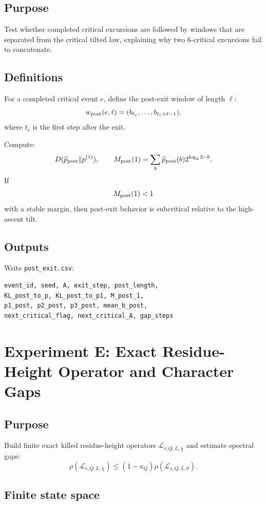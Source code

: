 \documentclass[11pt]{article}
\newcommand{\calL}{\mathcal L}
\begin{document}
\subsection{Purpose}

Test whether completed critical excursions are followed by windows that are separated from the critical tilted law, explaining why two \(6\)-critical excursions fail to concatenate.

\subsection{Definitions}

For a completed critical event \(e\), define the post-exit window of length \(\ell\):
\[
        w_{\rm post}(e,\ell)=(b_{t_e},\ldots,b_{t_e+\ell-1}),
\]
where \(t_e\) is the first step after the exit.

Compute:
\[
        D(\widehat p_{\rm post}\Vert p^{(1)}),
        \qquad
        M_{\rm post}(1)=\sum_b \widehat p_{\rm post}(b)2^{\log_2 3-b}.
\]
If
\[
        M_{\rm post}(1)<1
\]
with a stable margin, then post-exit behavior is subcritical relative to the high-ascent tilt.

\subsection{Outputs}

Write \texttt{post\_exit.csv}:
\begin{lstlisting}
event_id, seed, A, exit_step, post_length,
KL_post_to_p, KL_post_to_p1, M_post_1,
p1_post, p2_post, p3_post, mean_b_post,
next_critical_flag, next_critical_A, gap_steps
\end{lstlisting}

\section{Experiment E: Exact Residue-Height Operator and Character Gaps}

\subsection{Purpose}

Build finite exact killed residue-height operators \(\calL_{s,Q,L,\chi}\) and estimate spectral gaps:
\[
        \rho(\calL_{s,Q,L,\chi})
        \le
        (1-\kappa_Q)\rho(\calL_{s,Q,L,0}).
\]

\subsection{Finite state space}
\end{document}
